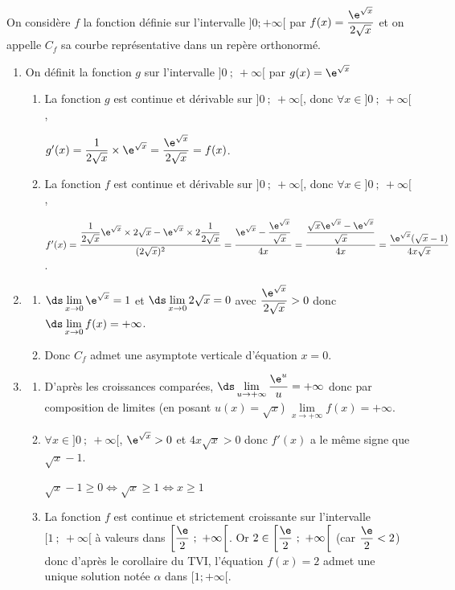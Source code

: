 \medskip

On considère $f$ la fonction définie sur l'intervalle $]0; +\infty[$ par $f(x) = \dfrac{\e^{\sqrt{x}}}{2 \sqrt{x}}$ et on appelle $C_f$ sa courbe représentative dans un repère orthonormé.

\begin{enumerate}
\item On définit la fonction $g$ sur l'intervalle $]0~;~ +\infty[$ par $g(x) = \e^{\sqrt{x}}$
	\begin{enumerate}
		\item La fonction $g$ est continue et dérivable sur $]0~;~+\infty[$, donc $\forall x \in ]0~;~+\infty[$,

$g'(x) = \dfrac{1}{2\sqrt{x}}\times \e^{\sqrt{x}}= \dfrac{\e^{\sqrt{x}}}{2\sqrt{x}} = f(x)$.
		\item La fonction $f$ est continue et dérivable sur $]0~;~+\infty[$, donc $\forall x \in ]0~;~+\infty[$,
	
$f'(x) = \dfrac{\dfrac{1}{2\sqrt{x}}\e^{\sqrt{x}}\times2\sqrt{x}-\e^{\sqrt{x}}\times 2\dfrac{1}{2\sqrt{x}}}{(2\sqrt{x})^2} = \dfrac{\e^{\sqrt{x}}-\dfrac{\e^{\sqrt{x}}}{\sqrt{x}}}{4x}=\dfrac{\dfrac{\sqrt{x}\e^{\sqrt{x}}-\e^{\sqrt{x}}}{\sqrt{x}}}{4x}= \dfrac{\e^{\sqrt{x}} (\sqrt{x} - 1)}{4 x \sqrt{x}}$.
	\end{enumerate}
	\item 
	\begin{enumerate}
		\item $\ds \lim\limits_{x \to 0} \e^{\sqrt{x}}=1$ et $\ds \lim\limits_{x \to 0} 2\sqrt{x}=0$ avec $\dfrac{\e^{\sqrt{x}}}{2 \sqrt{x}} > 0$ donc $\ds \lim\limits_{x \to 0}f(x)=+\infty$.
		\item Donc $C_f$ admet une asymptote verticale d'équation $x=0$.
	\end{enumerate}
	\item 
	\begin{enumerate}
		\item D'après les croissances comparées, $\ds \lim\limits_{u \to +\infty} \dfrac{\e^u}{u}=+\infty$ donc par composition de limites (en posant $u(x)=\sqrt{x}$) $\lim\limits_{x \to +\infty} f(x)=+\infty$.
		\item $\forall x \in ]0~;~+\infty[$, $\e^{\sqrt{x}}>0$ et $4 x \sqrt{x}>0$ donc $f'(x)$ a le même signe que $\sqrt{x}-1$.

$\sqrt{x}-1\geqslant 0 \iff \sqrt{x}\geqslant1 \iff x\geqslant1$

\begin{center}
\end{center}
		\item La fonction $f$ est continue et strictement croissante sur l'intervalle $[1~;~+\infty[$ à valeurs dans $\left[\dfrac{\e}{2}~;~+\infty\right[$. Or $2\in \left[\dfrac{\e}{2}~;~+\infty\right[$ (car $\dfrac{\e}{2}<2$) donc d'après le corollaire du TVI, l'équation $f(x) = 2$ admet une unique solution notée $\alpha$ dans $[1;+\infty[$.


\end{enumerate}
\end{enumerate}
